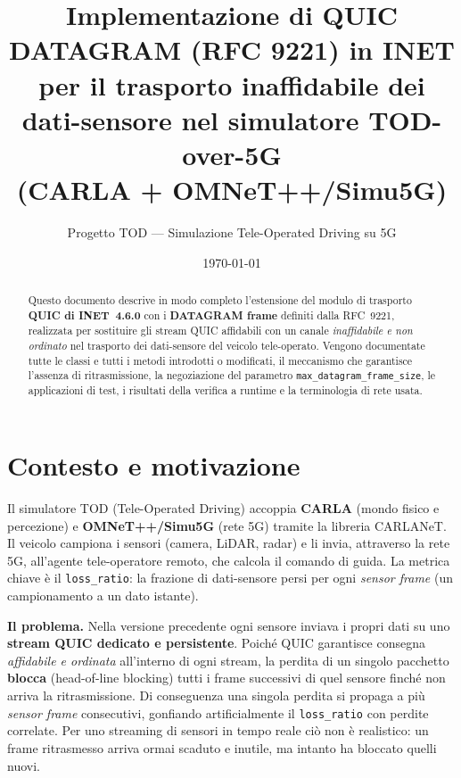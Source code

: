 \documentclass[11pt,a4paper]{article}
\title{\vspace{-1cm}\textbf{Implementazione di QUIC DATAGRAM (RFC 9221) in INET}\\[2mm]
\large per il trasporto inaffidabile dei dati-sensore nel simulatore TOD-over-5G\\(CARLA + OMNeT++/Simu5G)}
\author{Progetto TOD --- Simulazione Tele-Operated Driving su 5G}
\date{\today}
\newcommand{\code}[1]{\texttt{#1}}
\begin{document}
\maketitle
\thispagestyle{fancy}

\begin{abstract}
\noindent Questo documento descrive in modo completo l'estensione del modulo di trasporto
\textbf{QUIC di INET~4.6.0} con i \textbf{DATAGRAM frame} definiti dalla RFC~9221, realizzata per
sostituire gli stream QUIC affidabili con un canale \emph{inaffidabile e non ordinato} nel trasporto
dei dati-sensore del veicolo tele-operato. Vengono documentate tutte le classi e tutti i metodi
introdotti o modificati, il meccanismo che garantisce l'assenza di ritrasmissione, la negoziazione del
parametro \code{max\_datagram\_frame\_size}, le applicazioni di test, i risultati della verifica a runtime
e la terminologia di rete usata.
\end{abstract}

\tableofcontents
\newpage

\section{Contesto e motivazione}
Il simulatore TOD (Tele-Operated Driving) accoppia \textbf{CARLA} (mondo fisico e percezione) e
\textbf{OMNeT++/Simu5G} (rete 5G) tramite la libreria CARLANeT. Il veicolo campiona i sensori (camera,
LiDAR, radar) e li invia, attraverso la rete 5G, all'agente tele-operatore remoto, che calcola il comando
di guida. La metrica chiave \`e il \code{loss\_ratio}: la frazione di dati-sensore persi per ogni
\emph{sensor frame} (un campionamento a un dato istante).

\medskip
\noindent\textbf{Il problema.} Nella versione precedente ogni sensore inviava i propri dati su uno
\textbf{stream QUIC dedicato e persistente}. Poich\'e QUIC garantisce consegna \emph{affidabile e ordinata}
all'interno di ogni stream, la perdita di un singolo pacchetto \textbf{blocca} (head-of-line blocking) tutti
i frame successivi di quel sensore finch\'e non arriva la ritrasmissione. Di conseguenza una singola
perdita si propaga a pi\`u \emph{sensor frame} consecutivi, gonfiando artificialmente il \code{loss\_ratio}
con perdite correlate. Per uno streaming di sensori in tempo reale ci\`o non \`e realistico: un frame
ritrasmesso arriva ormai scaduto e inutile, ma intanto ha bloccato quelli nuovi.
\end{document}

